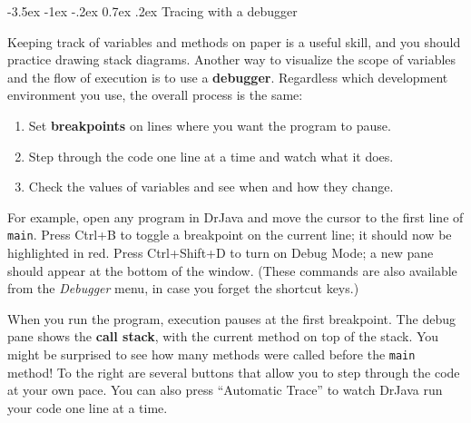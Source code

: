 \documentclass[12pt]{book}
\makeatletter
\theoremstyle{exercise}
\newcommand{\java}[1]{\verb"#1"}
\renewcommand{\section}{\@startsection{section}{1}{\z@}%
    {-3.5ex \@plus -1ex \@minus -.2ex}%
    {0.7ex \@plus.2ex}%
    {\normalfont\Large\bfseries}}
\newcommand{\java}[1]{\lstinline{#1}} %
\makeatother
\begin{document}
\section{Tracing with a debugger}
\label{debugger}


Keeping track of variables and methods on paper is a useful skill, and you should practice drawing stack diagrams.
Another way to visualize the scope of variables and the flow of execution is to use a {\bf debugger}.
Regardless which development environment you use, the overall process is the same:


\begin{enumerate}
\item Set {\bf breakpoints} on lines where you want the program to pause.
\item Step through the code one line at a time and watch what it does.
\item Check the values of variables and see when and how they change.
\end{enumerate}

For example, open any program in DrJava and move the cursor to the first line of \java{main}.
Press Ctrl+B to toggle a breakpoint on the current line; it should now be highlighted in red.
Press Ctrl+Shift+D to turn on Debug Mode; a new pane should appear at the bottom of the window.
(These commands are also available from the {\em Debugger} menu, in case you forget the shortcut keys.)


When you run the program, execution pauses at the first breakpoint.
The debug pane shows the {\bf call stack}, with the current method on top of the stack.
You might be surprised to see how many methods were called before the \java{main} method!
To the right are several buttons that allow you to step through the code at your own pace.
You can also press ``Automatic Trace'' to watch DrJava run your code one line at a time.
\end{document}
